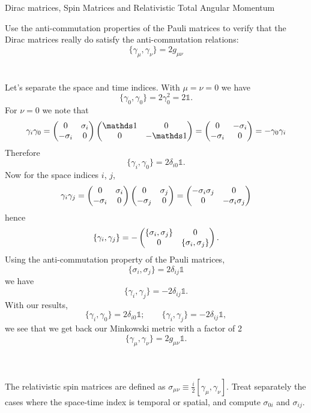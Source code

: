 \documentclass[10pt,letterpaper]{article}
\begin{document}
	\eenum
	\item{Dirac matrices, Spin Matrices and Relativistic Total Angular Momentum }
	\\ 
	\benum
	\item 
	Use the anti-commutation properties of the Pauli matrices to verify that the Dirac matrices really
	do satisfy the anti-commutation relations:
	\[
		\{ \gamma_\mu,\gamma_\nu \} = 2g_{\mu\nu}
	\]
	\\
	\\
	Let's separate the space and time indices. With $\mu = \nu = 0$ we have
	\[
		\{ \gamma_0,\gamma_0 \} = 2\gamma_0^2 = 2\mathds 1.
	\]
	For $\nu = 0$ we note that
	\[
		\gamma_i \gamma_0 = \bpm 0 & \sigma_i \\ -\sigma_i & 0 \epm
		 \bpm \mathds 1 & 0 \\ 0 & -\mathds 1\epm  = \bpm 0&-\sigma_i\\ -\sigma_i &0\epm
		 = -\gamma_0\gamma_i
	\]
	Therefore
	\[
		\{ \gamma_i,\gamma_0 \} = 2\delta_{i 0} \mathds 1.
	\]
	Now for the space indices $i$, $j$,
	\[
		\gamma_i\gamma_j = 
		\begin{pmatrix} 0 & \sigma_i \\ -\sigma_i & 0 \end{pmatrix}
		\begin{pmatrix} 0 & \sigma_j \\ -\sigma_j & 0 \end{pmatrix}
		= \begin{pmatrix} -\sigma_i\sigma_j & 0\\ 0 & -\sigma_i\sigma_j \end{pmatrix}
	\]
	hence
	\[
		\{ \gamma_i,\gamma_j \} =- \begin{pmatrix} \{ \sigma_i,\sigma_j\} & 0 \\ 0& \{\sigma_i,\sigma_j\}  \end{pmatrix}.
	\]
	Using the anti-commutation property of the Pauli matrices,
	\[
		\{ \sigma_i,\sigma_j \} = 2\delta_{ij}\mathds 1
	\]
	we have
	\[
		\{ \gamma_i,\gamma_j \} =
		-2 \delta_{ij}\mathds 1.
	\]
	With our results,
	\[
		\{ \gamma_i,\gamma_0 \} = 2\delta_{i 0} \mathds 1;\qquad 
		\{ \gamma_i,\gamma_j \} = -2\delta_{i j} \mathds 1,
	\]
	we see that we get back our Minkowski metric with a factor of 2
	\[
		\{ \gamma_\mu,\gamma_\nu \} = 2g_{\mu\nu}\mathds 1.
	\]
	\\ \\
	\item
	The relativistic spin matrices are defined as $\sigma_{\mu\nu} \equiv \frac{i}{2}[ \gamma_\mu
	,\gamma_\nu]$. Treat separately the cases where the space-time index is temporal or spatial, and 
	compute $\sigma_{0i}$ and $\sigma_{ij}$. 
	\\
	\\
\end{document}
